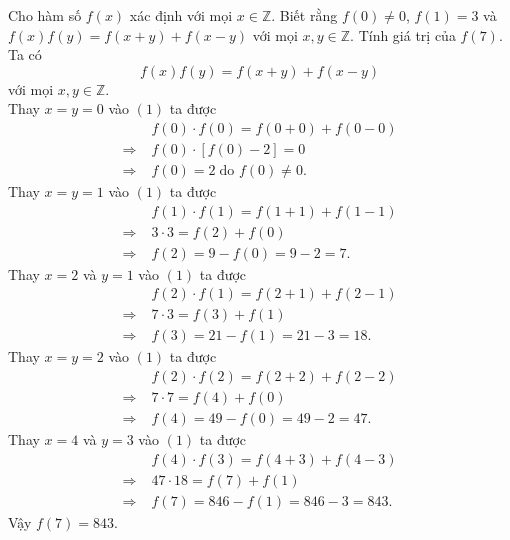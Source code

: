 \begin{vd}
Cho hàm số $f(x)$ xác định với mọi $x\in\mathbb{Z}$. Biết rằng $f(0)\ne 0$, $f(1)=3$ và $f(x)f(y)=f(x+y)+f(x-y)$ với mọi $x,y\in\mathbb{Z}$. Tính giá trị của $f(7)$.
\loigiai
{
Ta có \[f(x)f(y)=f(x+y)+f(x-y)\tag{1}\] với mọi $x,y\in\mathbb{Z}$.\\ Thay $x=y=0$ vào $(1)$ ta được
\begin{align*}
&f(0)\cdot f(0)=f(0+0)+f(0-0)\\ 
\Rightarrow\;&f(0)\cdot \left[f(0)-2\right]=0\\
\Rightarrow\;&f(0)=2\;\text{do $f(0)\ne 0$}.
\end{align*}
Thay $x=y=1$ vào $(1)$ ta được
\begin{align*}
&f(1)\cdot f(1)=f(1+1)+f(1-1)\\ 
\Rightarrow\;&3\cdot 3=f(2)+f(0)\\
\Rightarrow\;&f(2)=9-f(0)=9-2=7.
\end{align*}
Thay $x=2$ và $y=1$ vào $(1)$ ta được
\begin{align*}
&f(2)\cdot f(1)=f(2+1)+f(2-1)\\ 
\Rightarrow\;&7\cdot 3=f(3)+f(1)\\
\Rightarrow\;&f(3)=21-f(1)=21-3=18.
\end{align*}
Thay $x=y=2$ vào $(1)$ ta được
\begin{align*}
&f(2)\cdot f(2)=f(2+2)+f(2-2)\\ 
\Rightarrow\;&7\cdot 7=f(4)+f(0)\\
\Rightarrow\;&f(4)=49-f(0)=49-2=47.
\end{align*}
Thay $x=4$ và $y=3$ vào $(1)$ ta được
\begin{align*}
&f(4)\cdot f(3)=f(4+3)+f(4-3)\\ 
\Rightarrow\;&47\cdot 18=f(7)+f(1)\\
\Rightarrow\;&f(7)=846-f(1)=846-3=843.
\end{align*}
Vậy $f(7)=843$.
}
\end{vd}


